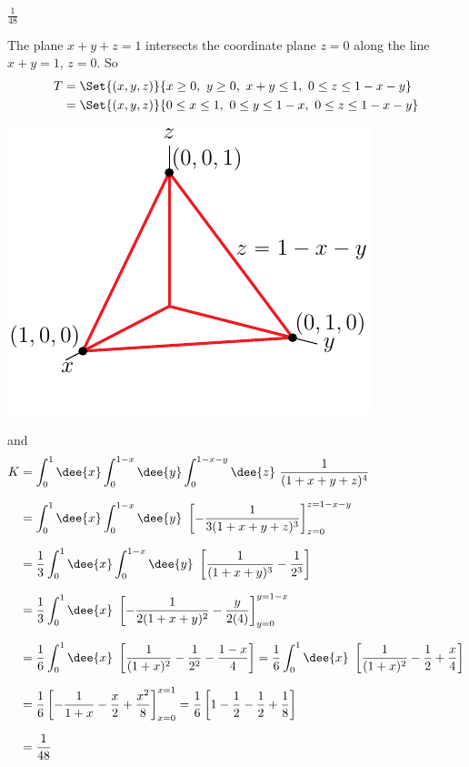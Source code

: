\begin{answer}
$\frac{1}{48}$
\end{answer}

\begin{solution}
The plane $x+y+z=1$ intersects the coordinate plane $z=0$
along the line $x+y=1$, $z=0$. So
\begin{align*}
T&=\Set{(x,y,z)}{x\ge 0,\  y\ge0,\ x+y\le 1,\ 0\le z\le 1-x-y} \\
 &=\Set{(x,y,z)}{0\le x\le 1,\  0\le y\le 1-x,\ 0\le z\le 1-x-y}
\end{align*}
\begin{center}
     \includegraphics{fig/OE10D_7.pdf}
\end{center}
and
\begin{align*}
K&=\int_0^1\dee{x}\int_0^{1-x}\dee{y}\int_0^{1-x-y}\dee{z}\ 
           \frac{1}{ (1 + x + y + z)^4} \\[0.1in]
&=\int_0^1\dee{x}\int_0^{1-x}\dee{y}\ 
           \left[-\frac{1}{ 3(1 + x + y + z)^3}\right]_{z=0}^{z=1-x-y} \\[0.1in]
&=\frac{1}{3}\int_0^1\dee{x}\int_0^{1-x}\dee{y}\ 
           \left[\frac{1}{(1 + x + y)^3} - \frac{1}{2^3}\right] \\[0.1in]
&=\frac{1}{3}\int_0^1\dee{x}\ 
    \left[-\frac{1}{2(1 + x + y)^2} - \frac{y}{2(4)}\right]_{y=0}^{y=1-x} \\[0.1in]
&=\frac{1}{6}\int_0^1\dee{x}\ 
    \left[\frac{1}{(1 + x)^2}-\frac{1}{2^2}- \frac{1-x}{4}\right]
=\frac{1}{6}\int_0^1\dee{x}\ 
    \left[\frac{1}{(1 + x)^2} -\frac{1}{2} + \frac{x}{4}\right] \\[0.1in]
&=\frac{1}{6} 
    \left[-\frac{1}{1 + x} -\frac{x}{2} + \frac{x^2}{8}\right]_{x=0}^{x=1}
=\frac{1}{6} 
    \left[1-\frac{1}{2} -\frac{1}{2} + \frac{1}{8}\right] \\[0.1in]
&=\frac{1}{48}
\end{align*}
\end{solution}

